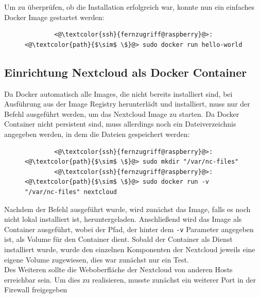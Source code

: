 \documentclass[a4paper, 12pt]{scrartcl}
\begin{document}
Um zu überprüfen, ob die Installation erfolgreich war, konnte nun ein einfaches Docker Image gestartet werden:
\begin{figure}[H]
    \begin{mdframed}[backgroundcolor=bbg]
        \begin{lstlisting}
        <@\textcolor{ssh}{fernzugriff@raspberry}@>:<@\textcolor{path}{$\sim$ \$}@> sudo docker run hello-world
        \end{lstlisting}
    \end{mdframed}
    \label{lst:setup_docker_repo}
\end{figure}


\subsection{Einrichtung Nextcloud als Docker Container}
Da Docker automatisch alle Images, die nicht bereits installiert sind, bei Ausführung aus der Image Registry herunterlädt und installiert, muss nur der Befehl ausgeführt werden,
um das Nextcloud Image zu starten. Da Docker Container nicht persistent sind, muss allerdings noch ein Dateiverzeichnis angegeben werden, in dem die Dateien gespeichert werden:
\begin{figure}[H]
    \begin{mdframed}[backgroundcolor=bbg]
        \begin{lstlisting}
        <@\textcolor{ssh}{fernzugriff@raspberry}@>:<@\textcolor{path}{$\sim$ \$}@> sudo mkdir "/var/nc-files"
        <@\textcolor{ssh}{fernzugriff@raspberry}@>:<@\textcolor{path}{$\sim$ \$}@> sudo docker run -v "/var/nc-files" nextcloud
        \end{lstlisting}
    \end{mdframed}
    \label{lst:folder_for_nextcloud}
\end{figure}
Nachdem der Befehl ausgeführt wurde, wird zunächst das Image, falls es noch nicht lokal installiert ist, heruntergeladen. Anschließend wird das Image als Container ausgeführt, wobei
der Pfad, der hinter dem \lstinline[basicstyle={\small\ttfamily\color{black}}]|-v| Parameter angegeben ist, als Volume für den Container dient. Sobald der Container als Dienst
installiert wurde, wurde den einzelnen Komponenten der Nextcloud jeweils eine eigene Volume zugewiesen, dies war zunächst nur ein Test.
\\
Des Weiteren sollte die Weboberfläche der Nextcloud von anderen Hosts erreichbar sein. Um dies zu realisieren, musste zunächst ein weiterer Port in der Firewall freigegeben
\end{document}
